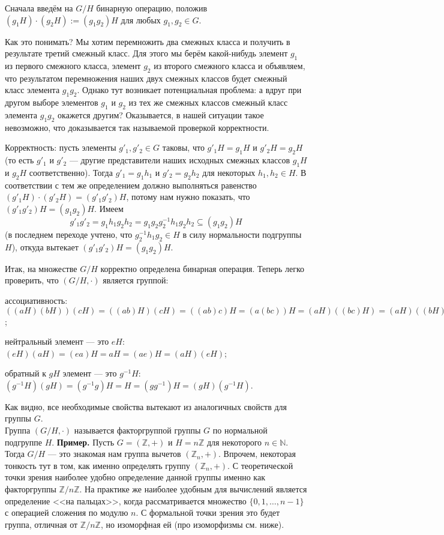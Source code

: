 Сначала введём на $G/H$ бинарную операцию, положив $(g_1H) \cdot (g_2H) := (g_1g_2)H$ для любых $g_1, g_2 \in G$. 

Как это понимать? Мы хотим перемножить два смежных класса и получить в результате третий смежный класс. Для этого мы берём какой-нибудь элемент $g_1$ из первого смежного класса, элемент $g_2$ из второго смежного класса и объявляем, что результатом перемножения наших двух смежных классов будет смежный класс элемента $g_1g_2$. Однако тут возникает потенциальная проблема: а вдруг при другом выборе элементов $g_1$ и $g_2$ из тех же смежных классов смежный класс элемента $g_1g_2$ окажется другим? Оказывается, в нашей ситуации такое невозможно, что доказывается так называемой проверкой корректности.

Корректность: пусть элементы $g'_1, g'_2 \in G$ таковы, что $g'_1H = g_1H$ и $g'_2H = g_2H$ (то есть $g'_1$ и $g'_2$ --- другие представители наших исходных смежных классов $g_1H$ и $g_2H$ соответственно). Тогда $g'_1 = g_1h_1$ и $g'_2 = g_2h_2$ для некоторых $h_1, h_2 \in H$. В соответствии с тем же определением должно выполняться равенство $(g'_1H) \cdot (g'_2H) = (g'_1g'_2)H$, потому нам нужно показать, что $(g'_1g'_2)H = (g_1g_2)H$. Имеем
\[
g'_1g'_2 = g_1h_1g_2h_2 = g_1g_2g_2^{-1}h_1g_2h_2 \subseteq (g_1g_2)H
\]
(в последнем переходе учтено, что $g_2^{-1}h_1g_2 \in H$ в силу нормальности подгруппы $H$), откуда вытекает $(g'_1g'_2)H = (g_1g_2)H$.

Итак, на множестве $G/H$ корректно определена бинарная операция. Теперь легко проверить, что $(G/H, \cdot)$ является группой:

ассоциативность: $((aH)(bH))(cH) = ((ab)H)(cH) = ((ab)c)H = (a(bc))H = (aH)((bc)H) = (aH)((bH)(cH))$;

нейтральный элемент --- это $eH$: $(eH)(aH) = (ea)H = aH = (ae)H = (aH)(eH)$;

обратный к $gH$ элемент --- это $g^{-1}H$: $(g^{-1}H)(gH) = (g^{-1}g)H = H = (gg^{-1})H = (gH)(g^{-1}H)$.

Как видно, все необходимые свойства вытекают из аналогичных свойств для группы $G$.\\
Группа $(G/H, \cdot ) $ называется факторгруппой группы $G$ по нормальной подгруппе $H$.
\textbf{Пример.} Пусть $G = (\mathbb{Z},+)$ и $H = n\mathbb{Z}$ для некоторого $n \in \mathbb{N}$. Тогда $G/H$ --- это знакомая нам группа вычетов $(\mathbb{Z}_n,+)$. Впрочем, некоторая тонкость тут в том, как именно определять группу $(\mathbb{Z}_n,+)$. С теоретической точки зрения наиболее удобно определение данной группы именно как факторгруппы $\mathbb{Z}/n\mathbb{Z}$. На практике же наиболее удобным для вычислений является определение <<на пальцах>>, когда рассматривается множество $\{0,1,\ldots,n-1\}$ с операцией сложения по модулю $n$. С формальной точки зрения это будет группа, отличная от $\mathbb{Z}/n\mathbb{Z}$, но изоморфная ей (про изоморфизмы см. ниже). 
